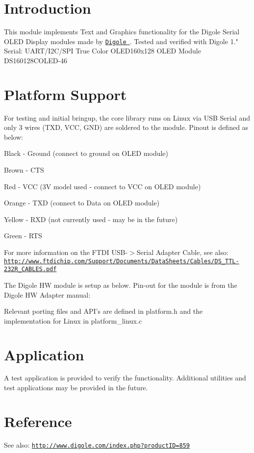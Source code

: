 \hypertarget{index_intro}{}\section{\-Introduction}\label{index_intro}
\-This module implements \-Text and \-Graphics functionality for the \-Digole \-Serial \-O\-L\-E\-D \-Display modules made by \href{http://www.digole.com/}{\tt \-Digole }. \-Tested and verified with \-Digole 1." \-Serial\-: \-U\-A\-R\-T/\-I2\-C/\-S\-P\-I \-True \-Color \-O\-L\-E\-D160x128 \-O\-L\-E\-D \-Module \-D\-S160128\-C\-O\-L\-E\-D-\/46\hypertarget{index_platform}{}\section{\-Platform Support}\label{index_platform}
\-For testing and initial bringup, the core library runs on \-Linux via \-U\-S\-B \-Serial and only 3 wires (\-T\-X\-D, \-V\-C\-C, \-G\-N\-D) are soldered to the module. \-Pinout is defined as below\-: 


\begin{DoxyItemize}
\item \-Black -\/ \-Ground (connect to ground on \-O\-L\-E\-D module) 
\item \-Brown -\/ \-C\-T\-S 
\item \-Red -\/ \-V\-C\-C (3\-V model used -\/ connect to \-V\-C\-C on \-O\-L\-E\-D module) 
\item \-Orange -\/ \-T\-X\-D (connect to \-Data on \-O\-L\-E\-D module) 
\item \-Yellow -\/ \-R\-X\-D (not currently used -\/ may be in the future) 
\item \-Green -\/ \-R\-T\-S 
\end{DoxyItemize}\-For more information on the \-F\-T\-D\-I \-U\-S\-B-\/$>$\-Serial \-Adapter \-Cable, see also\-: \href{http://www.ftdichip.com/Support/Documents/DataSheets/Cables/DS_TTL-232R_CABLES.pdf}{\tt http\-://www.\-ftdichip.\-com/\-Support/\-Documents/\-Data\-Sheets/\-Cables/\-D\-S\-\_\-\-T\-T\-L-\/232\-R\-\_\-\-C\-A\-B\-L\-E\-S.\-pdf} 

\-The \-Digole \-H\-W module is setup as below. \-Pin-\/out for the module is from the \-Digole \-H\-W \-Adapter manual\-:

 

\-Relevant porting files and \-A\-P\-I's are defined in platform.\-h and the implementation for \-Linux in platform\-\_\-linux.\-c \hypertarget{index_Test}{}\section{\-Application}\label{index_Test}
\-A test application is provided to verify the functionality. \-Additional utilities and test applications may be provided in the future.\hypertarget{index_ref}{}\section{\-Reference}\label{index_ref}
\-See also\-: \href{http://www.digole.com/index.php?productID=859}{\tt http\-://www.\-digole.\-com/index.\-php?product\-I\-D=859} 

